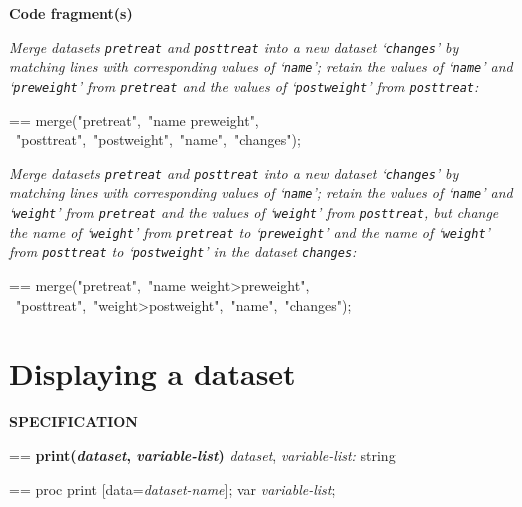 \documentclass{book}
\makeatletter
\newcommand\Texinfocommandstyletextvar[1]{{\normalfont{}\textsl{#1}}}%
\newenvironment{Texinfopreformatted}{%
  \par\GNUTobeylines\obeyspaces\frenchspacing\parskip=\z@\parindent=\z@}{}
{\catcode`\^^M=13 \gdef\GNUTobeylines{\catcode`\^^M=13 \def^^M{\null\par}}}
\newenvironment{Texinfoindented}{\begin{list}{}{}\item\relax}{\end{list}}
\renewcommand{\_}{\Texinfounderscore\discretionary{}{}{}}
\makeatother
\begin{document}
\noindent{}\textbf{Code fragment(s)}

\emph{Merge datasets \texttt{pretreat} and \texttt{posttreat} into a new
dataset `\texttt{changes}' by matching
lines with corresponding values of `\texttt{name}'; retain the values
of `\texttt{name}' and `\texttt{preweight}' from \texttt{pretreat} and
the values of `\texttt{postweight}' from \texttt{posttreat}:}
\begin{Texinfoindented}
\begin{Texinfopreformatted}%
\ttfamily merge("pretreat",\ "name preweight",
\      "posttreat",\ "postweight",\ "name",\ "changes");
\end{Texinfopreformatted}
\end{Texinfoindented}

\emph{Merge datasets \texttt{pretreat} and \texttt{posttreat} into a new
dataset `\texttt{changes}' by matching
lines with corresponding values of `\texttt{name}'; retain the values
of `\texttt{name}' and `\texttt{weight}' from \texttt{pretreat} and
the values of `\texttt{weight}' from \texttt{posttreat}, but change the name of
`\texttt{weight}' from \texttt{pretreat} to `\texttt{preweight}' and
the name of `\texttt{weight}' from \texttt{posttreat} to `\texttt{postweight}'
in the dataset \texttt{changes}:}
\begin{Texinfoindented}
\begin{Texinfopreformatted}%
\ttfamily merge("pretreat",\ "name weight>preweight",
\      "posttreat",\ "weight>postweight",\ "name",\ "changes");
\end{Texinfopreformatted}
\end{Texinfoindented}

\section{{Displaying a dataset}}
\label{anchor:Displaying-a-dataset}%

\noindent{}\textbf{SPECIFICATION}
\begin{Texinfoindented}
\begin{Texinfopreformatted}%
\textbf{print(\Texinfocommandstyletextvar{dataset}, \Texinfocommandstyletextvar{variable-list})}
\Texinfocommandstyletextvar{dataset}, \Texinfocommandstyletextvar{variable-list:} string
\end{Texinfopreformatted}
\end{Texinfoindented}

\begin{Texinfoindented}
\begin{Texinfopreformatted}%
proc print [data=\Texinfocommandstyletextvar{dataset-name}];
var \Texinfocommandstyletextvar{variable-list};
\end{Texinfopreformatted}
\end{Texinfoindented}
\end{document}
